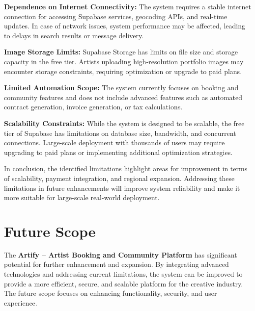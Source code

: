 \documentclass[12pt,a4paper]{report}
\begin{document}
\textbf{Dependence on Internet Connectivity:}
The system requires a stable internet connection for accessing Supabase services, geocoding APIs, and real-time updates. In case of network issues, system performance may be affected, leading to delays in search results or message delivery.

\vspace{0.3cm}

\textbf{Image Storage Limits:}
Supabase Storage has limits on file size and storage capacity in the free tier. Artists uploading high-resolution portfolio images may encounter storage constraints, requiring optimization or upgrade to paid plans.

\vspace{0.3cm}

\textbf{Limited Automation Scope:}
The system currently focuses on booking and community features and does not include advanced features such as automated contract generation, invoice generation, or tax calculations.

\vspace{0.3cm}

\textbf{Scalability Constraints:}
While the system is designed to be scalable, the free tier of Supabase has limitations on database size, bandwidth, and concurrent connections. Large-scale deployment with thousands of users may require upgrading to paid plans or implementing additional optimization strategies.

\vspace{0.5cm}

In conclusion, the identified limitations highlight areas for improvement in terms of scalability, payment integration, and regional expansion. Addressing these limitations in future enhancements will improve system reliability and make it more suitable for large-scale real-world deployment.

\section{Future Scope}

The \textbf{Artify -- Artist Booking and Community Platform} has significant potential for further enhancement and expansion. By integrating advanced technologies and addressing current limitations, the system can be improved to provide a more efficient, secure, and scalable platform for the creative industry. The future scope focuses on enhancing functionality, security, and user experience.
\end{document}
